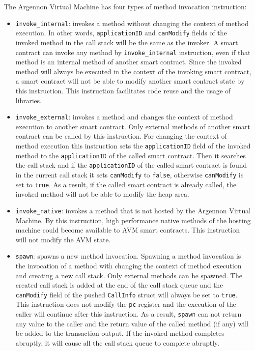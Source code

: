 The Argennon Virtual Machine has four types of method invocation instruction:
\begin{itemize}
    \item \texttt{invoke\_internal}: invokes a method without changing the context of method execution. In other
    words, \texttt{applicationID} and \texttt{canModify} fields of the invoked method in the
    call stack will be the same as the invoker.
    A smart contract can invoke any method by \texttt{invoke\_internal} instruction, even if that method is an
    internal method of another smart contract. Since the invoked method will always be executed in the context of
    the invoking smart contract, a smart contract will not be able to modify another smart contract state by
    this instruction. This instruction facilitates code reuse and the usage of libraries.
    \item \texttt{invoke\_external}: invokes a method and changes the context of method execution to another
    smart contract. Only external methods of another smart contract can be called by this instruction. For changing
    the context of method execution this instruction sets the \texttt{applicationID} field of the invoked method
    to the \texttt{applicationID} of the called smart contract. Then it searches the call stack and if
    the \texttt{applicationID} of the called smart contract is found in the current call stack it sets
    \texttt{canModify} to \texttt{false}, otherwise \texttt{canModify} is set to \texttt{true}.
    As a result, if the called smart contract is already called, the invoked method will not be
    able to modify the heap area.
    \item \texttt{invoke\_native}: invokes a method that is not hosted by the Argennon Virtual Machine. By this
    instruction, high performance native methods of the hosting machine could become available to AVM smart
    contracts. This instruction will not modify the AVM state.
    \item \texttt{spawn}: spawns a new method invocation. Spawning a method invocation is the invocation of a method
    with changing the context of method execution and creating a new call stack. Only external methods can
    be spawned. The created call stack is added at the end of the call stack queue and
    the \texttt{canModify} field of the pushed \texttt{CallInfo} struct will always
    be set to \texttt{true}. This instruction does not modify the \texttt{pc} register and the execution of the
    caller will continue after this instruction. As a result, \texttt{spawn} can not return
    any value to the caller and the return value of the called method (if any) will be added
    to the transaction output. If the invoked method completes abruptly, it will cause all the call stack queue to
    complete abruptly.
\end{itemize}

